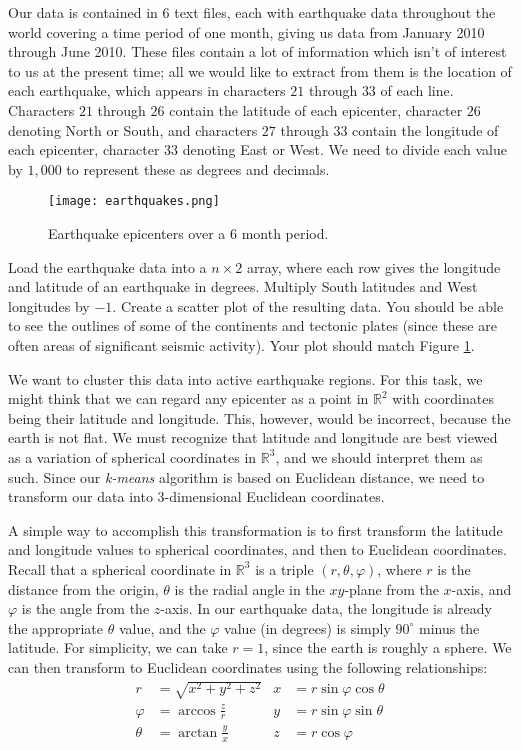 Our data is contained in 6 text files, each with earthquake data throughout the world covering a time period of one month, giving us data from January 2010 through June 2010.
These files contain a lot of information which isn't of interest to us at the present time; all we would like to extract from them is the location of each earthquake, which appears in characters $21$ through $33$ of each line.
Characters $21$ through $26$ contain the latitude of each epicenter, character $26$ denoting North or South, and characters $27$ through $33$ contain the longitude of each epicenter, character $33$ denoting East or West.
We need to divide each value by $1,000$ to represent these as degrees and decimals.
\begin{figure}
	\centering
	\texttt{[image: earthquakes.png]}
	\caption{Earthquake epicenters over a 6 month period.}
	\label{fig:earthquakes}
\end{figure}
\begin{problem}
Load the earthquake data into a $n\times 2$ array, where each row gives the longitude and latitude of an earthquake in degrees.
Multiply South latitudes and West longitudes by $-1$.
Create a scatter plot of the resulting data. You should be able to see the outlines of some of the continents and tectonic plates (since these are often areas of significant seismic activity). Your plot should match Figure \ref{fig:earthquakes}.
\end{problem}

We want to cluster this data into active earthquake regions.
For this task, we might think that we can regard any epicenter as a point in $\mathbb{R}^{2}$ with coordinates being their latitude and longitude.
This, however, would be incorrect, because the earth is not flat. We must recognize that latitude and longitude are best viewed as a variation of spherical coordinates in $\mathbb{R}^{3}$, and we should interpret them as such.
Since our \emph{k-means} algorithm is based on Euclidean distance, we need to transform our data into 3-dimensional Euclidean coordinates.

A simple way to accomplish this transformation is to first transform the latitude and longitude values to spherical coordinates, and then to Euclidean coordinates.
Recall that a spherical coordinate in $\mathbb{R}^3$ is a triple $(r,\theta,\varphi)$, where $r$ is the distance from the origin, $\theta$ is the radial angle in the $xy$-plane from the $x$-axis,
and $\varphi$ is the angle from the $z$-axis. In our earthquake data, the longitude is already the appropriate $\theta$ value, and the $\varphi$ value (in degrees) is simply $90^\circ$ minus the latitude.
For simplicity, we can take $r=1$, since the earth is roughly a sphere.
We can then transform to Euclidean coordinates using the following relationships:
\begin{align*}
r & = \sqrt{x^{2} + y^{2} + z^{2}} & x & = r \sin \varphi \cos \theta \\
\varphi & = \arccos \frac{z}{r} & y & = r \sin \varphi \sin \theta \\
\theta & = \arctan \frac{y}{x} & z & = r \cos \varphi
\end{align*}

